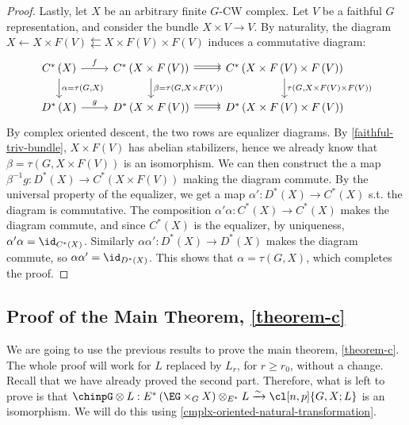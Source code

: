 \begin{proof}
	Lastly, let $X$ be an arbitrary finite $G$-CW complex.
	Let $V$ be a faithful $G$ representation, and consider the bundle $X \times V \to V$.
	By naturality, the diagram $X \leftarrow X \times F\left(V\right) \leftleftarrows X \times F\left(V\right) \times F\left(V\right)$ induces a commutative diagram:
	$$
	\begin{tikzcd}
		C^*\left(X\right) \arrow{r}{f} \arrow{d}{\alpha = \tau\left(G, X\right)}
		& C^*\left(X \times F\left(V\right)\right) \arrow{r}{} \arrow[shift left]{r}{} \arrow{d}{\beta = \tau\left(G, X \times F\left(V\right)\right)}
		& C^*\left(X \times F\left(V\right) \times F\left(V\right)\right) \arrow{d}{\tau\left(G, X \times F\left(V\right) \times F\left(V\right)\right)}
		\\
		D^*\left(X\right) \arrow{r}{g}
		& D^*\left(X \times F\left(V\right)\right) \arrow{r}{} \arrow[shift left]{r}{}
		& D^*\left(X \times F\left(V\right) \times F\left(V\right)\right)
	\end{tikzcd}
	$$
	By complex oriented descent, the two rows are equalizer diagrams.
	By \ref{faithful-triv-bundle}, $X \times F\left(V\right)$ has abelian stabilizers, hence we already know that $\beta = \tau\left(G, X \times F\left(V\right)\right)$ is an isomorphism.
	We can then construct the a map $\beta^{-1} g: D^*\left(X\right) \to C^*\left(X \times F\left(V\right)\right)$ making the diagram commute.
	By the universal property of the equalizer, we get a map $\alpha': D^*\left(X\right) \to C^*\left(X\right)$ s.t. the diagram is commutative.
	The composition $\alpha' \alpha: C^*\left(X\right) \to C^*\left(X\right)$ makes the diagram commute, and since $C^*\left(X\right)$ is the equalizer, by uniqueness, $\alpha' \alpha = \id_{C^*\left(X\right)}$.
	Similarly $\alpha \alpha': D^*\left(X\right) \to D^*\left(X\right)$ makes the diagram commute, so $\alpha \alpha' = \id_{D^*\left(X\right)}$.
	This shows that $\alpha = \tau\left(G, X\right)$, which completes the proof.
\end{proof}



\subsection{Proof of the Main Theorem, \ref{theorem-c}}

We are going to use the previous results to prove the main theorem, \ref{theorem-c}.
The whole proof will work for $L$ replaced by $L_r$, for $r \geq r_0$, without a change.
Recall that we have already proved the second part.
Therefore, what is left to prove is that 
$\chinpG \otimes L: E^*\left(\EG \times_G X\right) \otimes_{E^*} L \xrightarrow{\sim} \cl[n,p]{G,X; L}$
is an isomorphism.
We will do this using \ref{cmplx-oriented-natural-transformation}.

